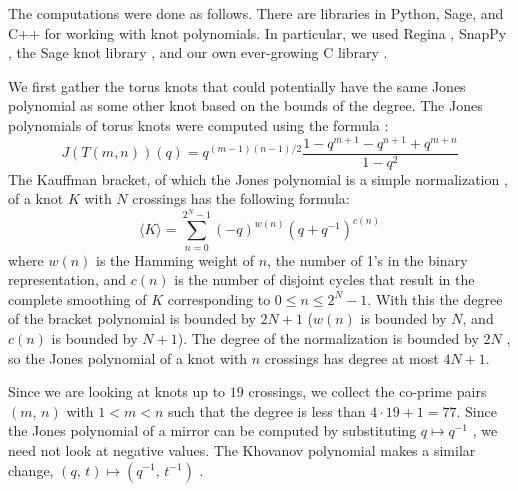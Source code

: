 \documentclass{article}
\theoremstyle{plain}
\begin{document}
        The computations were done as follows. There are libraries in Python,
        Sage, and C++ for working with knot polynomials. In particular, we used
        Regina \cite{regina}, SnapPy \cite{SnapPy}, the Sage knot library
        \cite{sage}, and our own ever-growing C library
        \cite{MaguireLibtmpl}.
        \par\hfill\par
        We first gather the torus knots that could potentially have the same
        Jones polynomial as some other knot based on the bounds of the degree.
        The Jones polynomials of torus knots were computed using the formula
        \cite{jonesfordummyvjones}:
        \begin{equation}
            \label{eqn:jones_poly_torus}%
            J(T(m,n))(q)=q^{(m-1)(n-1)/2}
                \frac{1-q^{m+1}-q^{n+1}+q^{m+n}}{1-q^{2}}
        \end{equation}
        The Kauffman bracket, of which the Jones polynomial is a simple
        normalization \cite{BarNatanKhovanovJones},
        of a knot $K$ with $N$ crossings has the following formula:
        \begin{equation}
            \langle{K}\rangle=\sum_{n=0}^{2^{N}-1}(-q)^{w(n)}(q+q^{-1})^{c(n)}
        \end{equation}
        where $w(n)$ is the Hamming weight of $n$, the number of 1's in the
        binary representation, and $c(n)$ is the number of disjoint cycles
        that result in the complete smoothing of $K$ corresponding to
        $0\leq{n}\leq{2}^{N}-1$. With this the degree of the bracket polynomial
        is bounded by $2N+1$ ($w(n)$ is bounded by $N$, and $c(n)$ is bounded
        by $N+1$). The degree of the normalization is bounded by $2N$
        \cite{BarNatanKhovanovJones}, so the
        Jones polynomial of a knot with $n$ crossings has degree at most
        $4N+1$.
        \par\hfill\par
        Since we are looking at knots up to $19$ crossings, we collect the
        co-prime pairs $(m,\,n)$ with $1<m<n$ such that the degree
        is less than $4\cdot{19}+1=77$. Since the Jones polynomial of a mirror
        can be computed by substituting $q\mapsto{q}^{-1}$
        \cite{jonespolyjones}, we need not look at
        negative values. The Khovanov polynomial makes a similar change,
        $(q,\,t)\mapsto(q^{-1},\,t^{-1})$
        \cite{WATSON2017915}.
        \par\hfill\par
\end{document}
